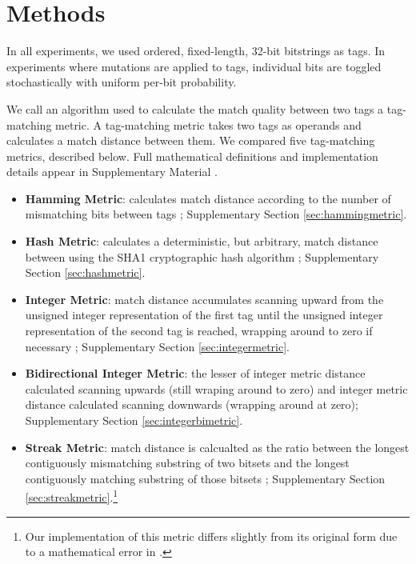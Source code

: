 \section{Methods}

In all experiments, we used ordered, fixed-length, 32-bit bitstrings as tags.
In experiments where mutations are applied to tags, individual bits are toggled stochastically with uniform per-bit probability.

We call an algorithm used to calculate the match quality between two tags a tag-matching metric.
A tag-matching metric takes two tags as operands and calculates a match distance between them.
We compared five tag-matching metrics, described below.
Full mathematical definitions and implementation details appear in Supplementary Material \citep{TODOSUPPLEMENT}.

\begin{itemize}
  \item \textbf{Hamming Metric}: calculates match distance according to the number of mismatching bits between tags \citep{lalejini2019else, hamming1950error}; Supplementary Section \ref{sec:hammingmetric}.
  \item \textbf{Hash Metric}: calculates a deterministic, but arbitrary, match distance between using the SHA1 cryptographic hash algorithm \citep{eastlake2001us}; Supplementary Section \ref{sec:hashmetric}.
  \item \textbf{Integer Metric}: match distance accumulates scanning upward from the unsigned integer representation of the first tag until the unsigned integer representation of the second tag is reached, wrapping around to zero if necessary \citep{spector2011tag}; Supplementary Section \ref{sec:integermetric}.
  \item \textbf{Bidirectional Integer Metric}: the lesser of integer metric distance calculated scanning upwards (still wraping around to zero) and integer metric distance calculated scanning downwards (wrapping around at zero); Supplementary Section \ref{sec:integerbimetric}.
  \item \textbf{Streak Metric}: match distance is calcualted as the ratio between the longest contiguously mismatching substring of two bitsets and the longest contiguously matching substring of those bitsets \citep{downing2015intelligence}; Supplementary Section \ref{sec:streakmetric}.\footnote{Our implementation of this metric differs slightly from its original form due to a mathematical error in \citep{downing2015intelligence}.}
\end{itemize}

